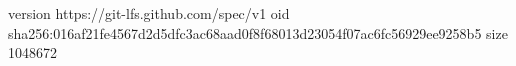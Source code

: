 version https://git-lfs.github.com/spec/v1
oid sha256:016af21fe4567d2d5dfc3ac68aad0f8f68013d23054f07ac6fc56929ee9258b5
size 1048672
